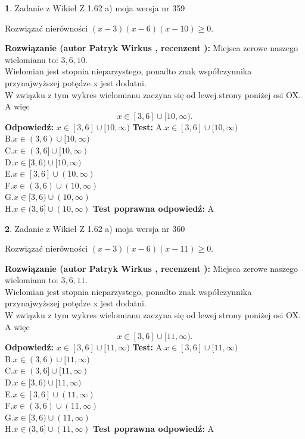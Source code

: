 \documentclass[12pt, a4paper]{article}
\theoremstyle{definition} %
\newtheorem{zad}{}
\newcommand{\zadStart}[1]{\begin{zad}#1\newline}
\newcommand{\zadStop}{\end{zad}}
\newcommand{\rozwStart}[2]{\noindent \textbf{Rozwiązanie (autor #1 , recenzent #2): }\newline}
\newcommand{\rozwStop}{\newline}
\newcommand{\odpStart}{\noindent \textbf{Odpowiedź:}\newline}
\newcommand{\odpStop}{\newline}
\newcommand{\testStart}{\noindent \textbf{Test:}\newline}
\newcommand{\testStop}{\newline}
\newcommand{\kluczStart}{\noindent \textbf{Test poprawna odpowiedź:}\newline}
\newcommand{\kluczStop}{\newline}
\begin{document}
\zadStart{Zadanie z Wikieł Z 1.62 a) moja wersja nr 359}

Rozwiązać nierówności $(x-3)(x-6)(x-10)\ge0$.
\zadStop
\rozwStart{Patryk Wirkus}{}
Miejsca zerowe naszego wielomianu to: $3, 6, 10$.\\
Wielomian jest stopnia nieparzystego, ponadto znak współczynnika przy\linebreak najwyższej potędze x jest dodatni.\\ W związku z tym wykres wielomianu zaczyna się od lewej strony poniżej osi OX. A więc $$x \in [3,6] \cup [10,\infty).$$
\rozwStop
\odpStart
$x \in [3,6] \cup [10,\infty)$
\odpStop
\testStart
A.$x \in [3,6] \cup [10,\infty)$\\
B.$x \in (3,6) \cup [10,\infty)$\\
C.$x \in (3,6] \cup [10,\infty)$\\
D.$x \in [3,6) \cup [10,\infty)$\\
E.$x \in [3,6] \cup (10,\infty)$\\
F.$x \in (3,6) \cup (10,\infty)$\\
G.$x \in [3,6) \cup (10,\infty)$\\
H.$x \in (3,6] \cup (10,\infty)$
\testStop
\kluczStart
A
\kluczStop



\zadStart{Zadanie z Wikieł Z 1.62 a) moja wersja nr 360}

Rozwiązać nierówności $(x-3)(x-6)(x-11)\ge0$.
\zadStop
\rozwStart{Patryk Wirkus}{}
Miejsca zerowe naszego wielomianu to: $3, 6, 11$.\\
Wielomian jest stopnia nieparzystego, ponadto znak współczynnika przy\linebreak najwyższej potędze x jest dodatni.\\ W związku z tym wykres wielomianu zaczyna się od lewej strony poniżej osi OX. A więc $$x \in [3,6] \cup [11,\infty).$$
\rozwStop
\odpStart
$x \in [3,6] \cup [11,\infty)$
\odpStop
\testStart
A.$x \in [3,6] \cup [11,\infty)$\\
B.$x \in (3,6) \cup [11,\infty)$\\
C.$x \in (3,6] \cup [11,\infty)$\\
D.$x \in [3,6) \cup [11,\infty)$\\
E.$x \in [3,6] \cup (11,\infty)$\\
F.$x \in (3,6) \cup (11,\infty)$\\
G.$x \in [3,6) \cup (11,\infty)$\\
H.$x \in (3,6] \cup (11,\infty)$
\testStop
\kluczStart
A
\kluczStop
\end{document}
